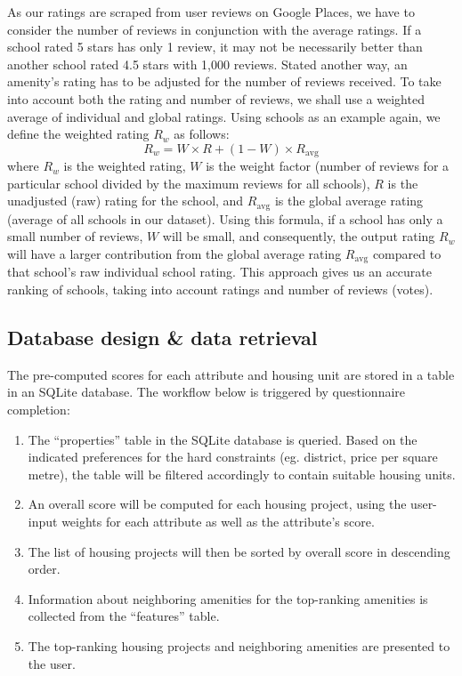 \documentclass[a4paper, 11pt]{article}
\begin{document}
As our ratings are scraped from user reviews on Google Places, we have to consider the number of reviews in conjunction with the average ratings. If a school rated 5 stars has only 1 review, it may not be necessarily better than another school rated 4.5 stars with 1,000 reviews. Stated another way, an amenity's rating has to be adjusted for the number of reviews received. To take into account both the rating and number of reviews, we shall use a weighted average of individual and global ratings. Using schools as an example again, we define the weighted rating $R_w$ as follows:
\[ R_w = W\times R +(1-W)\times R_{\text{avg}}\] where $R_w$ is the weighted rating, $W$ is the weight factor (number of reviews for a particular school divided by the maximum reviews for all schools), $R$ is the unadjusted (raw) rating for the school, and $R_{\text{avg}}$ is the global average rating (average of all schools in our dataset). Using this formula, if a school has only a small number of reviews, $W$ will be small, and consequently, the output rating $R_w$ will have a larger contribution from the global average rating $R_{\text{avg}}$ compared to that school's raw individual school rating. This approach gives us an accurate ranking of schools, taking into account ratings and number of reviews (votes).

\subsection{Database design \& data retrieval}

The pre-computed scores for each attribute and housing unit are stored in a table in an SQLite database. The workflow below is triggered by questionnaire completion:

\begin{enumerate}
    \item The “properties” table in the SQLite database is queried. Based on the indicated preferences for the hard constraints (eg. district, price per square metre), the table will be filtered accordingly to contain suitable housing units.
    \item An overall score will be computed for each housing project, using the user-input weights for each attribute as well as the attribute’s score.
    \item The list of housing projects will then be sorted by overall score in descending order.
    \item Information about neighboring amenities for the top-ranking amenities is collected from the “features” table.
    \item The top-ranking housing projects and neighboring amenities are presented to the user.
\end{enumerate}
\end{document}
